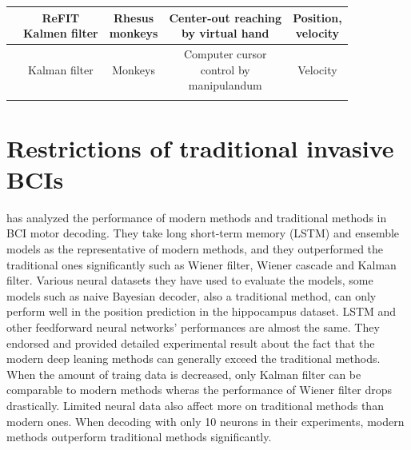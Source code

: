 \begin{longtable}{ccccc}
    \cite{vaskov2018cortical}   & \makecell{ReFIT\\Kalmen filter}       & \makecell{Rhesus\\monkeys} & \makecell{ Center-out reaching\\by virtual hand} & \makecell{Position,\\velocity} \\  \hline
    \cite{shaikh2019towards}    & Kalman filter             & Monkeys       & \makecell{ Computer cursor\\control by\\manipulandum} & Velocity \\  \hline
    \label{tab:traditional_invasive}
\end{longtable}


\section{Restrictions of traditional invasive BCIs}
\label{sec:restrictions_of_traditional_invasive_BCI}
\cite{glaser2020machine} has analyzed the performance of modern methods and traditional methods in BCI motor decoding.
They take long short-term memory (LSTM) and ensemble models as the representative of modern methods, 
and they outperformed the traditional ones significantly such as Wiener filter, 
Wiener cascade and Kalman filter.
Various neural datasets they have used to evaluate the models,
some models such as naive Bayesian decoder, also a traditional method, can only perform well in the position prediction in the hippocampus dataset.
LSTM and other feedforward neural networks' performances are almost the same. 
They endorsed and provided detailed experimental result about the fact that the modern deep leaning methods can generally exceed the traditional methods.
When the amount of traing data is decreased, only Kalman filter can be comparable to modern methods wheras the performance of Wiener filter drops drastically.
Limited neural data also affect more on traditional methods than modern ones.
When decoding with only 10 neurons in their experiments, modern methods outperform traditional methods significantly.


